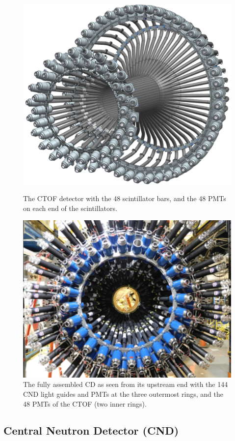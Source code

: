 \documentclass[final,3p,twocolumn]{elsarticle}
\begin{document}
\begin{figure}[t!]
\includegraphics[width=1.0\columnwidth]{ctof-design.png}
\caption{The CTOF detector with the 48 scintillator bars, and the 48 PMTs on each end of the scintillators.}
\label{ctof} 
\vspace{0.5cm}\centerline{\includegraphics[width=0.9\columnwidth]{cnd-ctof.png}}
\caption{The fully assembled CD as seen from its upstream end with the 144 CND light guides and PMTs at the
  three outermost rings, and the 48 PMTs of the CTOF (two inner rings).} 
\label{ctof-cnd}
\end{figure} 

\subsection{Central Neutron Detector (CND)}
\end{document}
